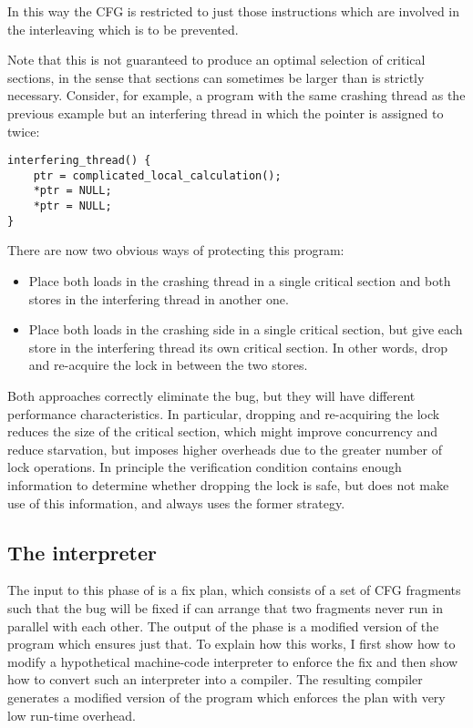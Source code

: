 In this way the CFG is restricted to just those instructions which are
involved in the interleaving which is to be prevented.

Note that this is not guaranteed to produce an optimal selection of
critical sections, in the sense that sections can sometimes be larger
than is strictly necessary.  Consider, for example, a program with the
same crashing thread as the previous example but an interfering thread
in which the pointer is assigned to twice:

\begin{verbatim}
interfering_thread() {
    ptr = complicated_local_calculation();
    *ptr = NULL;
    *ptr = NULL;
}
\end{verbatim}
    
There are now two obvious ways of protecting this program:

\begin{itemize}
\item
  Place both loads in the crashing thread in a single critical section and
  both stores in the interfering thread in another one.
\item
  Place both loads in the crashing side in a single critical section,
  but give each store in the interfering thread its own critical
  section.  In other words, drop and re-acquire the lock in between
  the two stores.
\end{itemize}

Both approaches correctly eliminate the bug, but they will have
different performance characteristics.  In particular, dropping and
re-acquiring the lock reduces the size of the critical section, which
might improve concurrency and reduce starvation, but imposes higher
overheads due to the greater number of lock operations.  In principle
the verification condition contains enough information to determine
whether dropping the lock is safe, but {\technique} does not make use
of this information, and always uses the former strategy.

\subsection{The interpreter}

 The input to this phase of {\technique} is a
fix plan, which consists of a set of CFG fragments such that the bug
will be fixed if {\technique} can arrange that two fragments never run
in parallel with each other.  The output of the phase is a modified
version of the program which ensures just that.  To explain how this
works, I first show how to modify a hypothetical machine-code
interpreter to enforce the fix and then show how to convert such an
interpreter into a compiler.  The resulting compiler generates a
modified version of the program which enforces the plan with very low
run-time overhead.


